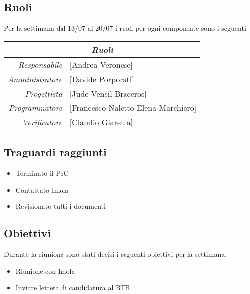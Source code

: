 \documentclass[12pt]{article}
\begin{document}
\subsection{Ruoli}
Per la settimana dal 13/07 al 20/07 i ruoli per ogni componente sono i seguenti
\\
\begin{tabular}{r | l}
    \multicolumn{2}{c}{\textit{Ruoli}}\\
    \hline
        \textit{Responsabile} &
        [Andrea Veronese]\makecell{}\\
        \textit{Amministratore} &
        [Davide Porporati]\makecell{}\\
        \textit{Progettista} &
        [Jude Vensil Braceros]\makecell{}\\
        \textit{Programmatore} &
        [Francesco Naletto Elena Marchioro]\makecell{}\\
        \textit{Verificatore} & 
        [Claudio Giaretta]\makecell{}\\
\end{tabular}

\subsection{Traguardi raggiunti}
\begin{itemize}
    \item Terminato il PoC
    \item Contattato Imola
    \item Revisionato tutti i documenti
    
\end{itemize}

\subsection{Obiettivi}
Durante la riunione sono stati decisi i seguenti obiettivi per la settimana:
\begin{itemize}
    \item Riunione con Imola
    \item Inviare lettera di candidatura al RTB
    
\end{itemize}
\end{document}
